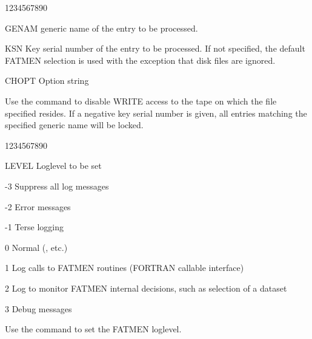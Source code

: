 \begin{DLtt}{1234567890}
\item[GENAM]generic name of the entry to be processed.
\item[KSN]Key serial number of the entry to be processed. If not specified,
the default FATMEN selection is used with the exception that disk files
are ignored.
\item[CHOPT]Option string
\end{DLtt}
Use the  command to disable WRITE access to the tape on which
the file specified resides. If a negative key serial number is given,
all entries matching the specified generic name will be locked.
\begin{DLtt}{1234567890}
\item[LEVEL]Loglevel to be set
\begin{DLtt}{12}
\item[-3]Suppress all log messages
\item[-2]Error messages
\item[-1]Terse logging
\item[0]Normal (,  etc.)
\item[1]Log calls to FATMEN routines (FORTRAN callable interface)
\item[2]Log to monitor FATMEN internal decisions, such as selection of a dataset
\item[3]Debug messages
\end{DLtt}
\end{DLtt}
Use the  command to set the FATMEN loglevel.
